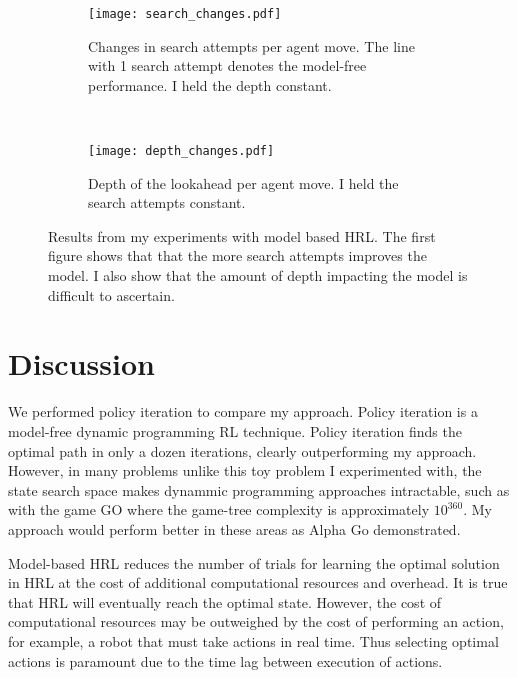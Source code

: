 \begin{figure*}[h]
    \centering
    \begin{subfigure}[h]{0.49\textwidth}
        \centering
        \texttt{[image: search\_changes.pdf]}
        \caption{Changes in search attempts per agent move. The line with 1 search attempt denotes the model-free performance. I held the depth constant.}
		\label{fig:search_changes}
    \end{subfigure}%
    ~ 
    \begin{subfigure}[h]{0.49\textwidth}
        \centering
        \texttt{[image: depth\_changes.pdf]}
        \caption{Depth of the lookahead per agent move. I held the search attempts constant.}
		\label{fig:depth_changes}
    \end{subfigure}
    \caption{Results from my experiments with model based HRL. The first figure shows that that the more search attempts improves the model. I also show that the amount of depth impacting the model is difficult to ascertain.}
\end{figure*}

\section{Discussion}
We performed policy iteration to compare my approach. Policy iteration is a model-free dynamic programming RL technique. Policy iteration finds the optimal path in only a dozen iterations, clearly outperforming my approach. However, in many problems unlike this toy problem I experimented with, the state search space makes dynammic programming approaches intractable, such as with the game GO where the game-tree complexity is approximately $10^{360}$. My approach would perform better in these areas as Alpha Go demonstrated.

Model-based HRL reduces the number of trials for learning the optimal solution in HRL at the cost of additional computational resources and overhead. It is true that HRL will eventually reach the optimal state. However, the cost of computational resources may be outweighed by the cost of performing an action, for example, a robot that must take actions in real time. Thus selecting optimal actions is paramount due to the time lag between execution of actions.


